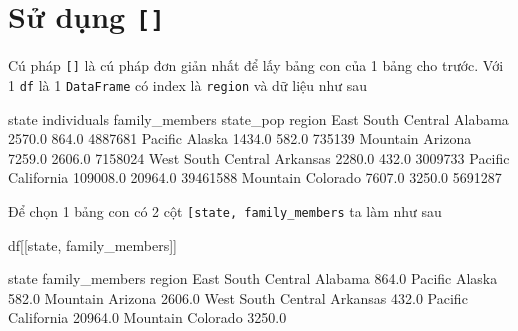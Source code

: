 \documentclass[
]{book}
\newenvironment{Shaded}{\begin{snugshade}}{\end{snugshade}}
\newcommand{\DecValTok}[1]{\textcolor[rgb]{0.00,0.00,0.81}{#1}}
\newcommand{\FloatTok}[1]{\textcolor[rgb]{0.00,0.00,0.81}{#1}}
\newcommand{\NormalTok}[1]{#1}
\newcommand{\StringTok}[1]{\textcolor[rgb]{0.31,0.60,0.02}{#1}}
\begin{document}
\section{\texorpdfstring{Sử dụng \texttt{{[}{]}}}{Sử dụng {[}{]}}}\label{sux1eed-dux1ee5ng}

Cú pháp \texttt{{[}{]}} là cú pháp đơn giản nhất để lấy bảng con của 1 bảng cho trước.
Với 1 \texttt{df} là 1 \texttt{DataFrame} có index là \texttt{region} và dữ liệu như sau

\begin{Shaded}
\begin{Highlighting}[]
\NormalTok{                         state  individuals  family\_members  state\_pop}
\NormalTok{region                                                                }
\NormalTok{East South Central     Alabama       }\FloatTok{2570.0}           \FloatTok{864.0}    \DecValTok{4887681}
\NormalTok{Pacific                 Alaska       }\FloatTok{1434.0}           \FloatTok{582.0}     \DecValTok{735139}
\NormalTok{Mountain               Arizona       }\FloatTok{7259.0}          \FloatTok{2606.0}    \DecValTok{7158024}
\NormalTok{West South Central    Arkansas       }\FloatTok{2280.0}           \FloatTok{432.0}    \DecValTok{3009733}
\NormalTok{Pacific             California     }\FloatTok{109008.0}         \FloatTok{20964.0}   \DecValTok{39461588}
\NormalTok{Mountain              Colorado       }\FloatTok{7607.0}          \FloatTok{3250.0}    \DecValTok{5691287}
\end{Highlighting}
\end{Shaded}

Để chọn 1 bảng con có 2 cột \texttt{{[}\textquotesingle{}state\textquotesingle{},\ \textquotesingle{}family\_members\textquotesingle{}{]}} ta làm như sau

\begin{Shaded}
\begin{Highlighting}[]
\NormalTok{df[[}\StringTok{\textquotesingle{}state\textquotesingle{}}\NormalTok{, }\StringTok{\textquotesingle{}family\_members\textquotesingle{}}\NormalTok{]]}
\end{Highlighting}
\end{Shaded}

\begin{Shaded}
\begin{Highlighting}[]
\NormalTok{                         state  family\_members}
\NormalTok{region                                        }
\NormalTok{East South Central     Alabama           864.0}
\NormalTok{Pacific                 Alaska           582.0}
\NormalTok{Mountain               Arizona          2606.0}
\NormalTok{West South Central    Arkansas           432.0}
\NormalTok{Pacific             California         20964.0}
\NormalTok{Mountain              Colorado          3250.0}
\end{Highlighting}
\end{Shaded}
\end{document}
